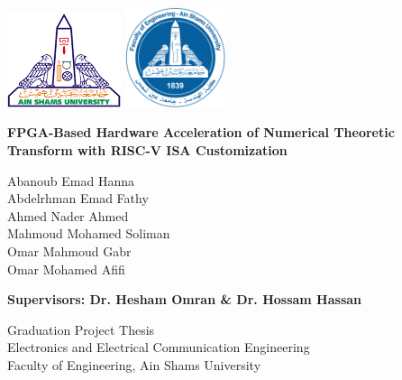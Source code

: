 \documentclass[12pt]{report}
\begin{document}
\begin{titlepage}
    \thispagestyle{empty}
    \centering
    \includegraphics[width=0.25\textwidth]{asu_logo.png} \hfill
    \includegraphics[width=0.22\textwidth]{eng_logo.png}
    \vspace{2.5cm}
    
    \LARGE \textbf{FPGA-Based Hardware Acceleration of Numerical Theoretic Transform with RISC-V ISA Customization} \\
    \vspace{0.5cm}

    \vspace{1.5cm}

    \large
    Abanoub Emad Hanna \\ \vspace{0.35cm}
    Abdelrhman Emad Fathy \\ \vspace{0.35cm}
    Ahmed Nader Ahmed \\ \vspace{0.35cm}
    Mahmoud Mohamed Soliman \\ \vspace{0.35cm}
    Omar Mahmoud Gabr \\ \vspace{0.35cm}
    Omar Mohamed Afifi
    \vspace{1.5cm}
    
    \textbf{Supervisors: Dr. Hesham Omran \& Dr. Hossam Hassan}
    \vspace{1.5cm}

    Graduation Project Thesis \\
    Electronics and Electrical Communication Engineering \\
    Faculty of Engineering, Ain Shams University \\

\end{titlepage}
\end{document}
